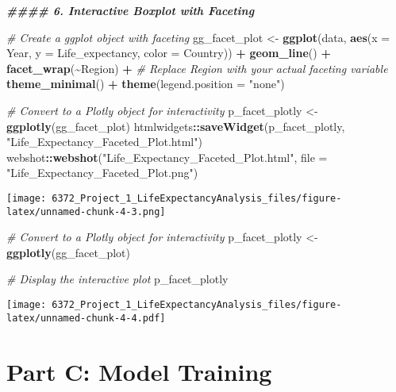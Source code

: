 \documentclass[
]{article}
\newenvironment{Shaded}{\begin{snugshade}}{\end{snugshade}}
\newcommand{\AttributeTok}[1]{\textcolor[rgb]{0.13,0.29,0.53}{#1}}
\newcommand{\CommentTok}[1]{\textcolor[rgb]{0.56,0.35,0.01}{\textit{#1}}}
\newcommand{\DocumentationTok}[1]{\textcolor[rgb]{0.56,0.35,0.01}{\textbf{\textit{#1}}}}
\newcommand{\FunctionTok}[1]{\textcolor[rgb]{0.13,0.29,0.53}{\textbf{#1}}}
\newcommand{\NormalTok}[1]{#1}
\newcommand{\OtherTok}[1]{\textcolor[rgb]{0.56,0.35,0.01}{#1}}
\newcommand{\SpecialCharTok}[1]{\textcolor[rgb]{0.81,0.36,0.00}{\textbf{#1}}}
\newcommand{\StringTok}[1]{\textcolor[rgb]{0.31,0.60,0.02}{#1}}
\begin{document}
\begin{Shaded}
\begin{Highlighting}[]
\DocumentationTok{\#\#\#\# 6. Interactive Boxplot with Faceting}

\CommentTok{\# Create a ggplot object with faceting}
\NormalTok{gg\_facet\_plot }\OtherTok{\textless{}{-}} \FunctionTok{ggplot}\NormalTok{(data, }\FunctionTok{aes}\NormalTok{(}\AttributeTok{x =}\NormalTok{ Year, }\AttributeTok{y =}\NormalTok{ Life\_expectancy, }\AttributeTok{color =}\NormalTok{ Country)) }\SpecialCharTok{+} 
  \FunctionTok{geom\_line}\NormalTok{() }\SpecialCharTok{+}
  \FunctionTok{facet\_wrap}\NormalTok{(}\SpecialCharTok{\textasciitilde{}}\NormalTok{Region) }\SpecialCharTok{+}  \CommentTok{\# Replace \textquotesingle{}Region\textquotesingle{} with your actual faceting variable}
  \FunctionTok{theme\_minimal}\NormalTok{() }\SpecialCharTok{+}
  \FunctionTok{theme}\NormalTok{(}\AttributeTok{legend.position =} \StringTok{"none"}\NormalTok{)}

\CommentTok{\# Convert to a Plotly object for interactivity}
\NormalTok{p\_facet\_plotly }\OtherTok{\textless{}{-}} \FunctionTok{ggplotly}\NormalTok{(gg\_facet\_plot)}
\NormalTok{htmlwidgets}\SpecialCharTok{::}\FunctionTok{saveWidget}\NormalTok{(p\_facet\_plotly, }\StringTok{"Life\_Expectancy\_Faceted\_Plot.html"}\NormalTok{)}
\NormalTok{webshot}\SpecialCharTok{::}\FunctionTok{webshot}\NormalTok{(}\StringTok{"Life\_Expectancy\_Faceted\_Plot.html"}\NormalTok{, }\AttributeTok{file =} \StringTok{"Life\_Expectancy\_Faceted\_Plot.png"}\NormalTok{)}
\end{Highlighting}
\end{Shaded}

\texttt{[image: 6372\_Project\_1\_LifeExpectancyAnalysis\_files/figure-latex/unnamed-chunk-4-3.png]}

\begin{Shaded}
\begin{Highlighting}[]
\CommentTok{\# Convert to a Plotly object for interactivity}
\NormalTok{p\_facet\_plotly }\OtherTok{\textless{}{-}} \FunctionTok{ggplotly}\NormalTok{(gg\_facet\_plot)}

\CommentTok{\# Display the interactive plot}
\NormalTok{p\_facet\_plotly}
\end{Highlighting}
\end{Shaded}

\texttt{[image: 6372\_Project\_1\_LifeExpectancyAnalysis\_files/figure-latex/unnamed-chunk-4-4.pdf]}

\hypertarget{part-c-model-training}{%
\section{Part C: Model Training}\label{part-c-model-training}}
\end{document}
